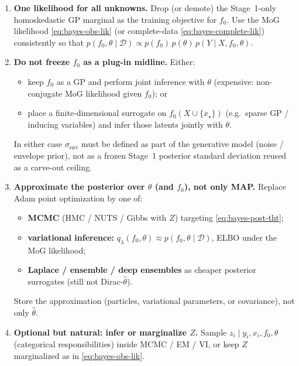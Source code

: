 \documentclass[11pt,a4paper]{article}
\theoremstyle{plain}
\theoremstyle{definition}
\theoremstyle{remark}
\newcommand{\D}{\mathcal{D}}
\newcommand{\tht}{\theta}
\begin{document}
\begin{enumerate}[leftmargin=1.3em,itemsep=0.35em]
  \item \textbf{One likelihood for all unknowns.}
        Drop (or demote) the Stage~1-only homoskedastic GP marginal as the training
        objective for \(f_0\). Use the MoG likelihood \eqref{eq:bayes-obs-lik}
        (or complete-data \eqref{eq:bayes-complete-lik}) consistently so that
        \(p(f_0,\tht\mid\D)\propto p(f_0)\,p(\tht)\,p(Y\mid X,f_0,\tht)\).

  \item \textbf{Do not freeze \(f_0\) as a plug-in midline.}
        Either:
        \begin{itemize}[leftmargin=1.1em]
          \item keep \(f_0\) as a GP and perform joint inference with \(\tht\)
                (expensive: non-conjugate MoG likelihood given \(f_0\)); or
          \item place a finite-dimensional surrogate on \(f_0(X\cup\{x_\star\})\)
                (e.g.\ sparse GP / inducing variables) and infer those latents
                jointly with \(\tht\).
        \end{itemize}
        In either case \(\sigma_{\mathrm{env}}\) must be defined as part of the
        generative model (noise / envelope prior), not as a frozen Stage~1
        posterior standard deviation reused as a carve-out ceiling.

  \item \textbf{Approximate the posterior over \(\tht\) (and \(f_0\)), not only MAP.}
        Replace Adam point optimization by one of:
        \begin{itemize}[leftmargin=1.1em]
          \item \textbf{MCMC} (HMC / NUTS / Gibbs with \(Z\)) targeting
                \eqref{eq:bayes-post-tht};
          \item \textbf{variational inference:} \(q_\lambda(f_0,\tht)\approx p(f_0,\tht\mid\D)\),
                ELBO under the MoG likelihood;
          \item \textbf{Laplace / ensemble / deep ensembles} as cheaper posterior
                surrogates (still not Dirac-\(\hat\tht\)).
        \end{itemize}
        Store the approximation (particles, variational parameters, or covariance),
        not only \(\hat\tht\).

  \item \textbf{Optional but natural: infer or marginalize \(Z\).}
        Sample \(z_i\mid y_i,x_i,f_0,\tht\) (categorical responsibilities) inside MCMC /
        EM / VI, or keep \(Z\) marginalized as in \eqref{eq:bayes-obs-lik}.


\end{enumerate}
\end{document}
